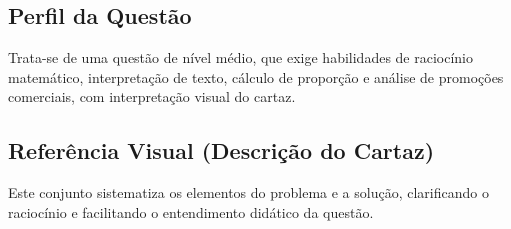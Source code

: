 \documentclass{article}
\begin{document}
\subsection*{Perfil da Questão}

Trata-se de uma questão de nível médio, que exige habilidades de raciocínio matemático, interpretação de texto, cálculo de proporção e análise de promoções comerciais, com interpretação visual do cartaz.

\newpage

\subsection*{Referência Visual (Descrição do Cartaz)}

Este conjunto sistematiza os elementos do problema e a solução, clarificando o raciocínio e facilitando o entendimento didático da questão.
\end{document}
